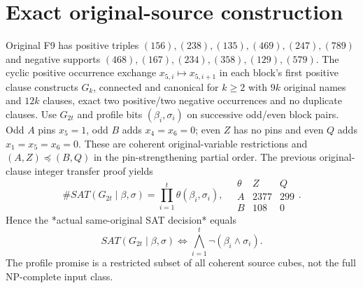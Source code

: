 \documentclass[11pt]{article}
\begin{document}
\section{Exact original-source construction}
Original F9 has positive triples $(156),(238),(135),(469),(247),(789)$ and negative supports $(468),(167),(234),(358),(129),(579)$. The cyclic positive occurrence exchange $x_{5,i}\mapsto x_{5,i+1}$ in each block's first positive clause constructs $G_k$, connected and canonical for $k\ge2$ with $9k$ original names and $12k$ clauses, exact two positive/two negative occurrences and no duplicate clauses.
Use $G_{2t}$ and profile bits $(\beta_i,\sigma_i)$ on successive odd/even block pairs. Odd $A$ pins $x_5=1$, odd $B$ adds $x_4=x_6=0$; even $Z$ has no pins and even $Q$ adds $x_1=x_5=x_6=0$. These are coherent original-variable restrictions and $(A,Z)\preceq(B,Q)$ in the pin-strengthening partial order.
The previous original-clause integer transfer proof yields
\[
\#SAT(G_{2t}\mid\beta,\sigma)=\prod_{i=1}^{t}\theta(\beta_i,\sigma_i),\quad
\begin{array}{c|cc}
\theta&Z&Q\\\hline
A&2377&299\\
B&108&0
\end{array}.
\]
Hence the *actual same-original SAT decision* equals
\[
\boxed{SAT(G_{2t}\mid\beta,\sigma)\iff
\bigwedge_{i=1}^t\neg(\beta_i\land\sigma_i).}\tag{1}
\]
The profile promise is a restricted subset of all coherent source cubes, not the full NP-complete input class.
\end{document}

